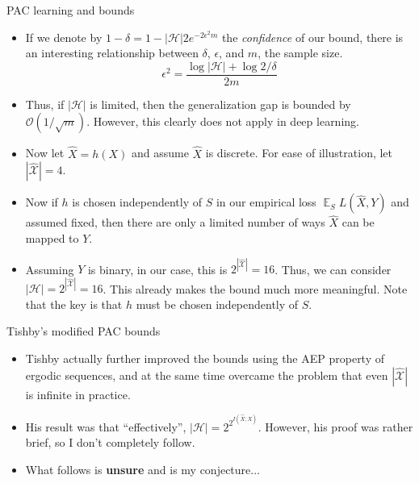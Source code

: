 \documentclass{beamer}
\DeclareMathOperator{\E}{\mathbb{E}}
\begin{document}
\begin{frame}{PAC learning and bounds}
	\begin{itemize}
		\item If we denote by $1-\delta=1- |\mathcal{H}|2e^{-2\epsilon^2m}$ the \emph{confidence} of our bound, there is an interesting relationship between $\delta$, $\epsilon$, and $m$, the sample size. 
		\[
			\epsilon^2 = \frac{\log |\mathcal{H}| + \log 2/\delta}{2m}
		\]
		\item Thus, if $|\mathcal{H}|$ is limited, then the generalization gap is bounded by $\mathcal{O}(1/\sqrt{m})$. However, this clearly does not apply in deep learning. 
		\item Now let $\hat{X} = h(X)$ and assume $\hat{X}$ is discrete. For ease of illustration, let $|\hat{\mathcal{X}}|=4$. 
		\item Now if $h$ is chosen independently of $S$ in our empirical loss $\E_S L(\hat{X}, Y)$ and assumed fixed, then there are only a limited number of ways $\hat{X}$ can be mapped to $Y$. 
		\item Assuming $Y$ is binary, in our case, this is $2^{|\hat{\mathcal{X}}|}=16$. Thus, we can consider $|\mathcal{H}|=2^{|\hat{\mathcal{X}}|}=16$. This already makes the bound much more meaningful. Note that the key is that $h$ must be chosen independently of $S$. 
	\end{itemize}
\end{frame}

\begin{frame}{Tishby's modified PAC bounds}
\begin{itemize}
	\item Tishby actually further improved the bounds using the AEP property of ergodic sequences, and at the same time overcame the problem that even $|\hat{\mathcal{X}}|$ is infinite in practice. 
	\item His result was that ``effectively'', $|\mathcal{H}|=2^{2^{I(\hat{X};X)}}$. However, his proof was rather brief, so I don't completely follow. 
	\item What follows is \textbf{unsure} and is my conjecture... 
\end{itemize}
\end{frame}
\end{document}

